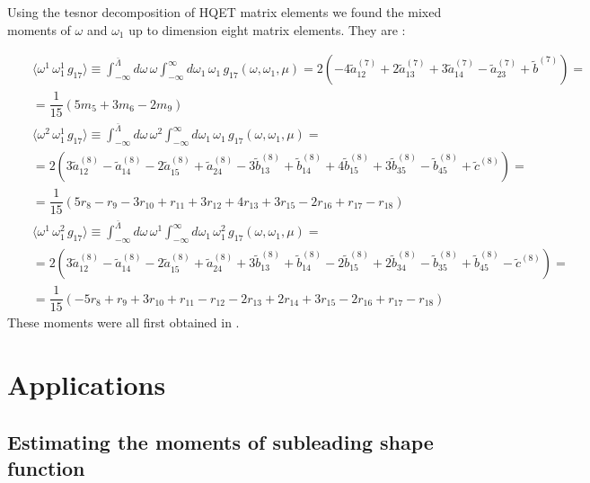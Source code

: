 Using the tesnor decomposition of HQET matrix elements we found the mixed moments of $\omega$ and $\omega_1$ up to dimension eight matrix elements. They are :

\begin{eqnarray}
&&\langle\omega^1\,\omega_1^1\,g_{17}\rangle\equiv\int^{\bar \Lambda}_{-\infty}d\omega\,\omega\int^{\infty}_{-\infty}d\omega_1\,\omega_1 \,g_{17}(\omega,\omega_1,\mu)=2 \left(-4 \tilde{a}^{(7)}_{12}+ 2\tilde{a}^{(7)}_{13} +3 \tilde{a}^{(7)}_{14} -  \tilde{a}^{(7)}_{23} + \tilde{b}^{(7)}\right)=\nonumber\\
&&=\dfrac1{15} \left(5 m_5 +3 m_6 -2m_9\right)\nonumber\\
%
&&\langle\omega^2\,\omega_1^1\,g_{17}\rangle\equiv\int^{\bar \Lambda}_{-\infty}d\omega\,\omega^2\int^{\infty}_{-\infty}d\omega_1\,\omega_1 \,g_{17}(\omega,\omega_1,\mu)=\nonumber\\
&&=2 \left(3 \tilde{a}^{(8)}_{12} - \tilde{a}^{(8)}_{14}  -2\tilde{a}^{(8)}_{15} +  \tilde{a}^{(8)}_{24} -3 \tilde{b}^{(8)}_{13} + \tilde{b}^{(8)}_{14} +4\tilde{b}^{(8)}_{15} +3\tilde{b}^{(8)}_{35} - \tilde{b}^{(8)}_{45} + \tilde{c}^{(8)}\right)=\nonumber\\
&&=\dfrac1{15} \left(5r_8 - r_9 -3 r_{10}+r_{11}+3r_{12}+4r_{13}+3r_{15}-2r_{16}+r_{17}-r_{18}\right)\nonumber\\
%
&&\langle\omega^1\,\omega_1^2\,g_{17}\rangle\equiv\int^{\bar \Lambda}_{-\infty}d\omega\,\omega^1\int^{\infty}_{-\infty}d\omega_1\,\omega_1^2 \,g_{17}(\omega,\omega_1,\mu)=\nonumber\\
&&=2 \left(3 \tilde{a}^{(8)}_{12} - \tilde{a}^{(8)}_{14} - 2\tilde{a}^{(8)}_{15} +  \tilde{a}^{(8)}_{24} +3 \tilde{b}^{(8)}_{13} + \tilde{b}^{(8)}_{14} - 2\tilde{b}^{(8)}_{15} + 2\tilde{b}^{(8)}_{34} -\tilde{b}^{(8)}_{35} + \tilde{b}^{(8)}_{45} - \tilde{c}^{(8)}\right)=\nonumber\\
&&=\dfrac1{15} \left(-5r_8 + r_9 +3 r_{10}+r_{11}-r_{12}-2r_{13}+2r_{14}+3r_{15}-2r_{16}+r_{17}-r_{18}\right)
\end{eqnarray}  
These moments were all first obtained in \cite{Gunawardana:2019gep}. 

\section{Applications}

\subsection{Estimating the moments of subleading shape function}

